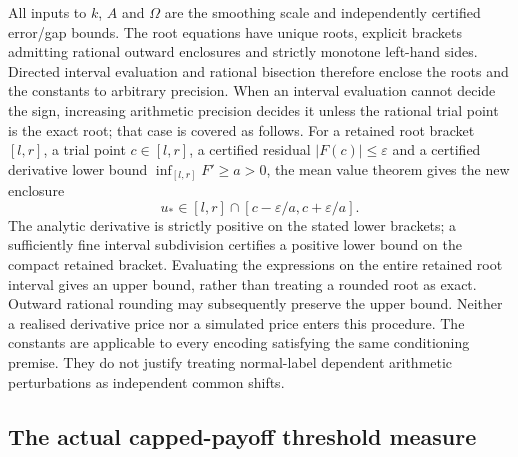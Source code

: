All inputs to $k$, $A$ and $\Omega$ are the smoothing scale and
independently certified error/gap bounds. The root equations have unique
roots, explicit brackets admitting rational outward enclosures and
strictly monotone left-hand sides. Directed interval evaluation and rational bisection
therefore enclose the roots and the constants to arbitrary precision.
When an interval evaluation cannot decide the sign, increasing arithmetic
precision decides it unless the rational trial point is the exact root;
that case is covered as follows. For a retained root bracket $[l,r]$,
a trial point $c\in[l,r]$, a certified residual $|F(c)|\leq\varepsilon$
and a certified derivative lower bound
$\inf_{[l,r]}F'\geq a>0$, the mean value theorem gives the new enclosure
\begin{equation}
 u_*\in[l,r]\cap[c-\varepsilon/a,c+\varepsilon/a].
 \label{eq:sharp-root-residual-enclosure}
\end{equation}
The analytic derivative is strictly positive on the stated lower brackets;
a sufficiently fine interval subdivision certifies a positive lower
bound on the compact retained bracket. Evaluating the expressions on the entire retained root interval
gives an upper bound, rather than treating a rounded root as exact.
Outward rational rounding may subsequently preserve the upper bound.
Neither a realised derivative price nor a simulated price enters this
procedure. The constants are applicable to every encoding satisfying the
same conditioning premise. They do not justify treating normal-label
dependent arithmetic perturbations as independent common shifts.

\subsection{The actual capped-payoff threshold measure}

